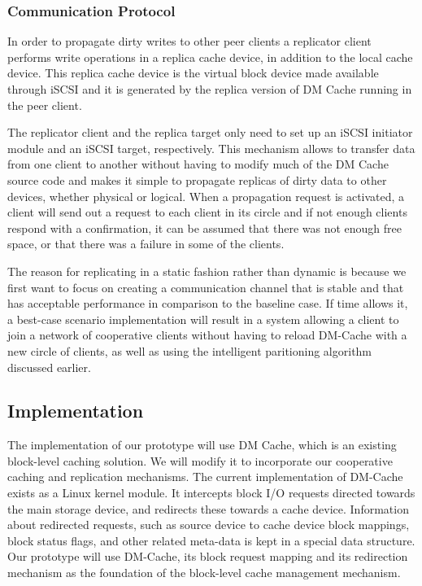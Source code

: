 \subsubsection{Communication Protocol}

In order to propagate dirty writes to other peer clients a 
replicator client performs write operations in a replica 
cache device, in addition to the local cache device. This replica
cache device is the virtual block device made available through iSCSI
and it is generated by the replica version of DM Cache running in the
peer client.

The replicator client and the replica target only
need to set up an iSCSI initiator module and an iSCSI target,
respectively. This mechanism allows to transfer data from one client 
to another without having to modify much of the DM Cache source code
and makes it simple to propagate replicas of dirty data to other
devices, whether physical or logical. When a propagation
request is activated, a client will send out a request to
each client in its circle and if not enough clients respond with a
confirmation, it can be assumed that there was not enough free space,
or that there was a failure in some of the clients.

The reason for replicating in a static fashion rather than dynamic is
because we first want to focus on creating
a communication channel that is stable and that has acceptable performance
in comparison to the baseline case. If time allows it, a best-case scenario
implementation will result in a system allowing a client to join a network of
cooperative clients without having to reload DM-Cache with a new circle of clients,
as well as using the intelligent paritioning algorithm discussed earlier.

\subsection{Implementation}

The implementation of our prototype will use DM Cache,
which is an existing block-level caching solution. We will
modify it to incorporate our cooperative caching and
replication mechanisms. The current implementation of
DM-Cache exists as a Linux kernel module. It intercepts
block I/O requests directed towards the main storage device,
and redirects these towards a cache device. Information
about redirected requests, such as source device to cache
device block mappings, block status flags, and other
related meta-data is kept in a special data structure. Our
prototype will use DM-Cache, its block request mapping and
its redirection mechanism as the foundation of
the block-level cache management mechanism.

